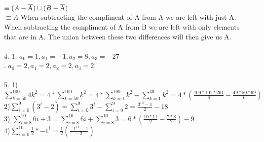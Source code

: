 \documentclass[11pt, oneside]{article}   	%
\begin{document}
$\equiv (A - \overline{\rm A})\cup (B - \overline{\rm A})$\\
$\equiv A$
When subtracting the compliment of A from A we are left with just A. When subtracting the compliment of A from B we are left with only elements that are in A. The union between these two differences will then give us A. \\\\
4. 1. $a_0 = 1, a_1 = -1, a_2 = 8, a_3 = -27$\\
.  $a_0 = 2, a_1 = 2, a_2 = 2, a_3 = 2$\\\\
5. 1) $\sum\limits_{k=50}^{100} 4k^2 = 4*\sum\limits_{k=50}^{100} k^2 = 4 *\sum\limits_{k=1}^{100} k^2 - \sum\limits_{k=1}^{49} k^2 = 4*(\frac{100 * 101 * 201}{6} - \frac{49 * 50 * 99}{6})$\\
2)$\sum\limits_{i=0}^9 (3^i - 2) = \sum\limits_{i=0}^9 3^i - \sum\limits_{i=0}^9 2 = \frac{3^{10} - 1}{2} - 18$\\
3) $\sum\limits_{i=8}^{10} 6i + 3 = \sum\limits_{i=8}^{10} 6i + \sum\limits_{i=8}^{10} 3 = 6*(\frac{10*11}{2} - \frac{7*8}{2}) - 9$\\
4)$\sum\limits_{i=0}^{10} \frac{1}{2} * -1^i = \frac{1}{2} (\frac{-1^{11} - 1}{-2})$\\
\end{document}
